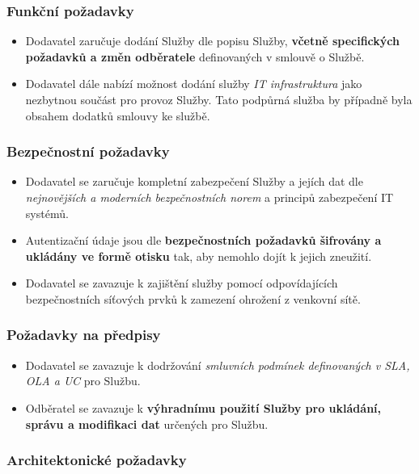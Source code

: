 \documentclass[11pt, a4paper, titlepage]{article}
\begin{document}
	\subsubsection*{Funkční požadavky}

	\begin{itemize}
		\item Dodavatel zaručuje dodání Služby dle popisu Služby, \textbf{včetně specifických požadavků a změn odběratele} definovaných v smlouvě o Službě.
		\item Dodavatel dále nabízí možnost dodání služby \emph{IT infrastruktura} jako nezbytnou součást pro provoz Služby. Tato podpůrná služba by případně byla obsahem dodatků smlouvy ke službě.
	\end{itemize}

	\subsubsection*{Bezpečnostní požadavky}

	\begin{itemize}
		\item Dodavatel se zaručuje kompletní zabezpečení Služby a jejích dat dle \emph{nejnovějších a moderních bezpečnostních norem} a principů zabezpečení IT systémů.
		\item Autentizační údaje jsou dle \textbf{bezpečnostních požadavků šifrovány a ukládány ve formě otisku} tak, aby nemohlo dojít k jejich zneužití.
		\item Dodavatel se zavazuje k zajištění služby pomocí odpovídajících bezpečnostních síťových prvků k zamezení ohrožení z venkovní sítě. 
	\end{itemize}

	\subsubsection*{Požadavky na předpisy}

	\begin{itemize}
		\item Dodavatel se zavazuje k dodržování \emph{smluvních podmínek definovaných v SLA, OLA a UC} pro Službu.
		\item Odběratel se zavazuje k \textbf{výhradnímu použití Služby pro ukládání, správu a modifikaci dat} určených pro Službu.
	\end{itemize}

	\subsubsection*{Architektonické požadavky}
\end{document}
